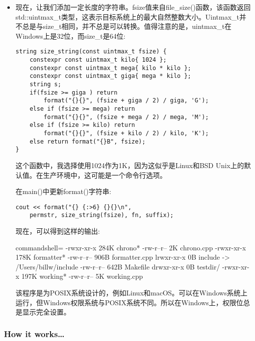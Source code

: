 \begin{itemize}
\item 
现在，让我们添加一定长度的字符串。fsize值来自file\_size()函数，该函数返回std::uintmax\_t类型，这表示目标系统上的最大自然整数大小。Uintmax\_t并不总是与size\_t相同，并不总是可以转换。值得注意的是，uintmax\_t在Windows上是32位，而size\_t是64位:

\begin{lstlisting}[style=styleCXX]
string size_string(const uintmax_t fsize) {
	constexpr const uintmax_t kilo{ 1024 };
	constexpr const uintmax_t mega{ kilo * kilo };
	constexpr const uintmax_t giga{ mega * kilo };
	string s;
	if(fsize >= giga ) return
		format("{}{}", (fsize + giga / 2) / giga, 'G');
	else if (fsize >= mega) return
		format("{}{}", (fsize + mega / 2) / mega, 'M');
	else if (fsize >= kilo) return
		format("{}{}", (fsize + kilo / 2) / kilo, 'K');
	else return format("{}B", fsize);
}
\end{lstlisting}

这个函数中，我选择使用1024作为1K，因为这似乎是Linux和BSD Unix上的默认值。在生产环境中，这可能是一个命令行选项。

在main()中更新format()字符串:

\begin{lstlisting}[style=styleCXX]
cout << format("{} {:>6} {}{}\n",
	permstr, size_string(fsize), fn, suffix);
\end{lstlisting}

现在，可以得到这样的输出:

\begin{tcblisting}{commandshell={}}
-rwxr-xr-x 284K chrono*
-rw-r--r--   2K chrono.cpp
-rwxr-xr-x 178K formatter*
-rw-r--r-- 906B formatter.cpp
lrwxr-xr-x   0B include -> /Users/billw/include
-rw-r--r-- 642B Makefile
drwxr-xr-x   0B testdir/
-rwxr-xr-x 197K working*
-rw-r--r--   5K working.cpp
\end{tcblisting}

\begin{tcolorbox}[colback=webgreen!5!white,colframe=webgreen!75!black,title=Note]
该程序是为POSIX系统设计的，例如Linux和macOS。可以在Windows系统上运行，但Windows权限系统与POSIX系统不同。所以在Windows上，权限位总是显示完全设置。
\end{tcolorbox}

\end{itemize}

\subsubsection{How it works…}

